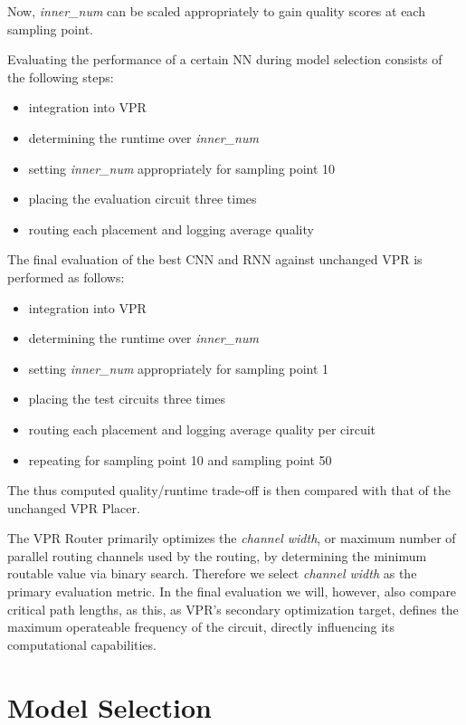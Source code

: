 Now, \textit{inner\_num} can be scaled appropriately to gain quality scores at each sampling point.

Evaluating the performance of a certain \gls{NN} during model selection consists of the following steps:

\begin{itemize}
	\item integration into \gls{VPR}
	\item determining the runtime over \textit{inner\_num}
	\item setting \textit{inner\_num} appropriately for sampling point 10
	\item placing the evaluation circuit three times
	\item routing each placement and logging average quality 
\end{itemize}

The final evaluation of the best \gls{CNN} and \gls{RNN} against unchanged \gls{VPR} is performed as follows:

\begin{itemize}
	\item integration into \gls{VPR}
	\item determining the runtime over \textit{inner\_num}
	\item setting \textit{inner\_num} appropriately for sampling point 1
	\item placing the test circuits three times
	\item routing each placement and logging average quality per circuit
	\item repeating for sampling point 10 and sampling point 50
\end{itemize}

The thus computed quality/runtime trade-off is then compared with that of the unchanged \gls{VPR} Placer.

The \gls{VPR} Router primarily optimizes the \textit{channel width}, or maximum number of parallel routing channels used by the routing, by determining the minimum routable value via binary search. Therefore we select \textit{channel width} as the primary evaluation metric. In the final evaluation we will, however, also compare critical path lengths, as this, as \gls{VPR}'s secondary optimization target, defines the maximum operateable frequency of the circuit, directly influencing its computational capabilities.

\section{Model Selection}\label{ch:model-selection}

